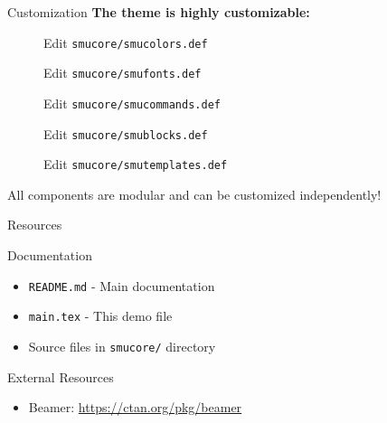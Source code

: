 \documentclass[10pt,aspectratio=1610]{beamer}
\begin{document}
\begin{frame}{Customization}
    \textbf{The theme is highly customizable:}
    
    \vspace{0.5em}
    
    \begin{description}
        \item[] Edit \texttt{smucore/smucolors.def}
        \item[] Edit \texttt{smucore/smufonts.def}
        \item[] Edit \texttt{smucore/smucommands.def}
        \item[] Edit \texttt{smucore/smublocks.def}
        \item[] Edit \texttt{smucore/smutemplates.def}
    \end{description}
    
    \vspace{1em}
    
    \begin{lightbox}
        All components are modular and can be customized independently!
    \end{lightbox}
\end{frame}

\begin{frame}{Resources}
    \begin{tagblock}{Documentation}
        \begin{itemize}
            \item \texttt{README.md} - Main documentation
            \item \texttt{main.tex} - This demo file
            \item Source files in \texttt{smucore/} directory
        \end{itemize}
    \end{tagblock}
    
    \vspace{0.5em}
    
    \begin{tagblock}{External Resources}
        \begin{itemize}
            \item Beamer: \url{https://ctan.org/pkg/beamer}
        \end{itemize}
    \end{tagblock}
\end{frame}
\end{document}
